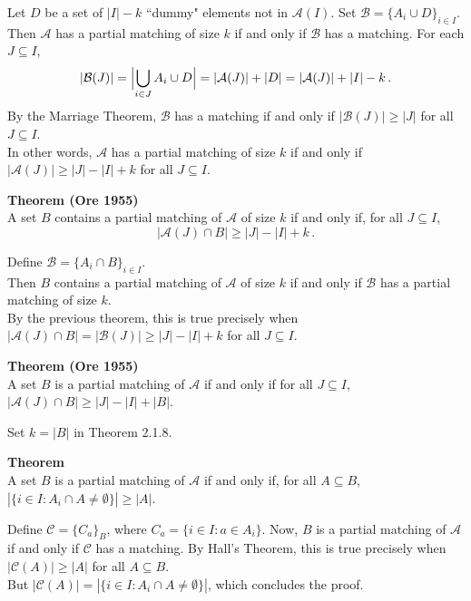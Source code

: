 \documentclass[a4paper]{article}
\let\oldendproof\endproof
\renewenvironment{proof}[1][\proofname]{%
  \oldproof[\scshape \noindent {\bfseries \text{Proof}}]%
}{\oldendproof}
\newenvironment{thm}[1]{
	\begin{framed}
	\noindent
	{\bfseries #1}\\}{\setlength{\itemsep}{0pt}
	\end{framed}
}
\newcommand{\Af}{\mathcal{A}}
\newcommand{\Bf}{\mathcal{B}}
\newcommand{\Cf}{\mathcal{C}}
\begin{document}
\begin{proof}
Let $D$ be a set of $|I| - k$ ``dummy" elements not in $\Af(I)$.
Set $\Bf = \{A_i \cup D\}_{i \in I}$.\\
Then $\Af$ has a partial matching of size $k$ if and only if $\Bf$ has a matching.
For each $J \subseteq I$,
\[
   |\Bf (J)|
    = \Bigl| \bigcup_{i \in J} A_i \cup D\Bigr|\\
    = |\Af(J)| + |D|\\
    = |\Af(J)| + |I| - k\,.
\]
By the Marriage Theorem, $\Bf$ has a matching if and only if
$|\Bf(J)| \geq |J|$ for all $J \subseteq I$.\\
In other words, $\Af$ has a partial matching of size $k$
if and only if $|\Af(J)| \geq |J| - |I| + k$ for all $J \subseteq I$.
\end{proof}

\begin{thm}{Theorem (Ore 1955)}
A set $B$ contains a partial matching of $\Af$ of size $k$
if and only if, for all $J \subseteq I$,
\[
  |\Af(J) \cap B| \geq |J| - |I| + k\,.
\]
\end{thm}

\begin{proof}
Define $\Bf = \{A_i \cap B\}_{i \in I}$.\\
Then $B$ contains a partial matching of $\Af$ of size $k$
if and only if $\Bf$ has a partial matching of size $k$.\\
By the previous theorem, this is true precisely when
$|\Af(J) \cap B| = |\Bf(J)| \geq |J| - |I| + k$ for all $J \subseteq I$.
\end{proof}

\begin{thm}{Theorem (Ore 1955)}
A set $B$ is a partial matching of $\Af$ if and only if
for all $J \subseteq I$, $|\Af(J) \cap B| \geq |J| - |I| + |B|$.
\end{thm}

\begin{proof}
Set $k = |B|$ in Theorem 2.1.8.
\end{proof}

\begin{thm}{Theorem}
  A set $B$ is a partial matching of $\Af$ if and only if, for all $A \subseteq B$,
  $|\{i \in I : A_i \cap A \neq \emptyset\}| \geq |A|$.
\end{thm}

\begin{proof}
Define $\Cf = \{C_a\}_B$, where $C_a = \{i \in I : a \in A_i\}$.
Now, $B$ is a partial matching of $\Af$ if and only if $\Cf$ has a matching.
By Hall's Theorem, this is true precisely when $|\Cf(A)| \geq |A|$ for all $A \subseteq B$.\\
But $|\Cf(A)| = |\{i \in I : A_i \cap A \neq \emptyset\}|$, which concludes the proof.
\end{proof}
\end{document}
